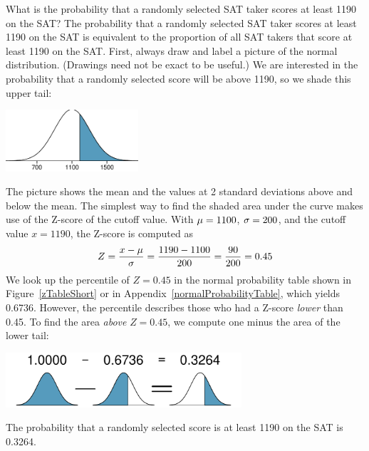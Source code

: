 \begin{examplewrap}
\begin{nexample}{What is the probability that a randomly selected SAT taker scores at least 1190 on the SAT?}\label{satAbove1190Exam}
The probability that a randomly selected SAT taker scores at least 1190 on the SAT is equivalent to the proportion of all SAT takers that score at least 1190 on the SAT. First, always draw and label a picture of the normal distribution. (Drawings need not be exact to be useful.) We are interested in the probability that a randomly selected score will be above 1190, so we shade this upper tail:
\begin{center}
\includegraphics[height=0.9in]{ch_distributions/figures/satAbove1190/satAbove1190}
\end{center}
The picture shows the mean and the values at 2 standard deviations above and below the mean. The simplest way to find the shaded area under the curve makes use of the Z-score of the cutoff value. With $\mu=1100{}$, $\sigma=200{}$, and the cutoff value $x=1190$, the Z-score is computed as
\begin{eqnarray*}
Z = \frac{x - \mu}{\sigma} = \frac{1190 - 1100{}}{200{}} = \frac{90}{200} = 0.45
\end{eqnarray*}
We look up the percentile of $Z=0.45$ in the normal probability table shown in Figure~\ref{zTableShort} or in Appendix~\vref{normalProbabilityTable}, which yields 0.6736. However, the percentile describes those who had a Z-score \emph{lower} than 0.45. To find the area \emph{above} $Z=0.45$, we compute one minus the area of the lower tail:
\begin{center}
\includegraphics[height=0.8in]{ch_distributions/figures/subtractingArea/subtractingArea}
\end{center}
The probability that a randomly selected score is at least 1190 on the SAT is 0.3264.
\end{nexample}
\end{examplewrap}

